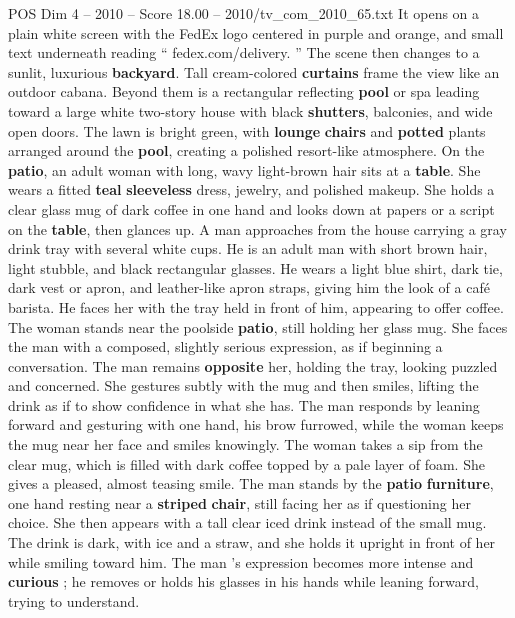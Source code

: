 \begin{textsample}{POS Dim 4 – 2010 – Score 18.00 – 2010/tv\_com\_2010\_65.txt}  \label{ex:f4_pos_024}
It opens on a plain white screen with the FedEx logo centered in purple and orange, and small text underneath reading “ fedex.com/delivery. ” The scene then changes to a sunlit, luxurious \textbf{backyard}.
Tall cream-colored \textbf{curtains} frame the view like an outdoor cabana.
Beyond them is a rectangular reflecting \textbf{pool} or spa leading toward a large white two-story house with black \textbf{shutters}, balconies, and wide open doors.
The lawn is bright green, with \textbf{lounge} \textbf{chairs} and \textbf{potted} plants arranged around the \textbf{pool}, creating a polished resort-like atmosphere.
On the \textbf{patio}, an adult woman with long, wavy light-brown hair sits at a \textbf{table}.
She wears a fitted \textbf{teal} \textbf{sleeveless} dress, jewelry, and polished makeup.
She holds a clear glass mug of dark coffee in one hand and looks down at papers or a script on the \textbf{table}, then glances up.
A man approaches from the house carrying a gray drink tray with several white cups.
He is an adult man with short brown hair, light stubble, and black rectangular glasses.
He wears a light blue shirt, dark tie, dark vest or apron, and leather-like apron straps, giving him the look of a café barista.
He faces her with the tray held in front of him, appearing to offer coffee.
The woman stands near the poolside \textbf{patio}, still holding her glass mug.
She faces the man with a composed, slightly serious expression, as if beginning a conversation.
The man remains \textbf{opposite} her, holding the tray, looking puzzled and concerned.
She gestures subtly with the mug and then smiles, lifting the drink as if to show confidence in what she has.
The man responds by leaning forward and gesturing with one hand, his brow furrowed, while the woman keeps the mug near her face and smiles knowingly.
The woman takes a sip from the clear mug, which is filled with dark coffee topped by a pale layer of foam.
She gives a pleased, almost teasing smile.
The man stands by the \textbf{patio} \textbf{furniture}, one hand resting near a \textbf{striped} \textbf{chair}, still facing her as if questioning her choice.
She then appears with a tall clear iced drink instead of the small mug.
The drink is dark, with ice and a straw, and she holds it upright in front of her while smiling toward him.
The man ’s expression becomes more intense and \textbf{curious} ; he removes or holds his glasses in his hands while leaning forward, trying to understand.

\end{textsample}
